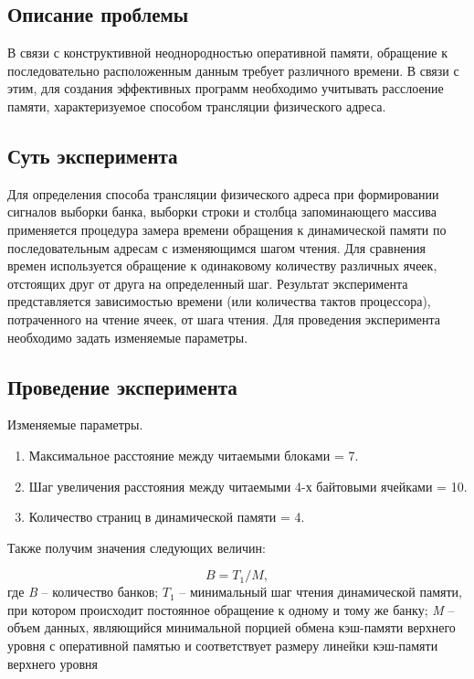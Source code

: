 \subsection{Описание проблемы}
В связи с конструктивной неоднородностью   оперативной памяти,   обращение к последовательно расположенным данным   требует различного времени. В связи с этим, для создания эффективных программ необходимо учитывать расслоение памяти, характеризуемое способом трансляции физического адреса. 

\subsection{Суть эксперимента}  
Для определения способа трансляции физического адреса при формировании сигналов выборки банка, выборки строки и столбца запоминающего массива применяется   процедура   замера   времени   обращения   к   динамической   памяти   по последовательным   адресам   с   изменяющимся   шагом   чтения.   Для   сравнения   времен используется обращение к одинаковому количеству различных ячеек,  отстоящих друг от друга   на   определенный шаг. Результат эксперимента представляется зависимостью времени (или количества тактов процессора), потраченного на чтение ячеек, от шага чтения. Для проведения эксперимента необходимо задать изменяемые параметры.


\subsection{Проведение эксперимента}

Изменяемые параметры.

\begin{enumerate}
	\item Максимальное расстояние между читаемыми блоками = 7.
	\item Шаг увеличения расстояния между читаемыми 4-х байтовыми ячейками = 10.
	\item Количество страниц в динамической памяти = 4.
\end{enumerate}




\clearpage


Также получим значения следующих величин:

\begin{equation}
	B = T_1 / M,
\end{equation}
где \textit{B} -- количество банков; $T_1$ -- минимальный шаг чтения динамической памяти, при котором происходит постоянное обращение к одному и тому же банку; \textit{M} -- объем данных, являющийся минимальной порцией обмена кэш-памяти верхнего уровня с оперативной памятью и соответствует размеру линейки кэш-памяти верхнего уровня


